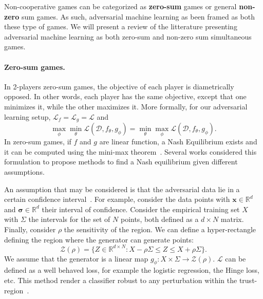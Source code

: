 Non-cooperative games can be categorized as \textbf{zero-sum} games or general \textbf{non-zero} sum games. As such, adversarial machine learning as been framed as both these type of games. We will present a review of the litterature presenting adversarial machine learning as both zero-sum and non-zero sum simultaneous games.

\paragraph{Zero-sum games.} In 2-players zero-sum games, the objective of each player is diametrically opposed. In other words, each player has the same objective, except that one minimizes it, while the other maximizes it. More formally, for our adversarial learning setup,  $\mathcal{L}_f=\mathcal{L}_g=\mathcal L$ and
\[
\max_{\phi}\min_{\theta}\mathcal{L}(\mathcal{D},f_{\theta},g_\phi) = \min_{\theta}\max_{\phi} \mathcal{L}(\mathcal{D},f_\theta,g_\phi).
\]
In zero-sum games, if $f$ and $g$ are linear function, a Nash Equilibrium exists and it can be computed using the mini-max theorem~\cite{roughgarden}. Several works considered this formulation to propose methods to find a Nash equilibrium given different assumptions.

An assumption that may be considered is that the adversarial data lie in a certain confidence interval~\cite{Ghaoui_robust_classification,Lanckriet_robust_minimax}. For example, consider the data points with $\bm x\in\mathbb{R}^d$ and $\bm\sigma\in\mathbb{R}^d$ their interval of confidence. Consider the empirical training set $X$ with $\Sigma$ the intervals for the set of $N$ points, both defined as a $d\times N$ matrix. Finally, consider $\rho$ the sensitivity of the region. We can define a hyper-rectangle defining the region where the generator can generate points:
\[
\mathcal{Z}(\rho) = \{Z\in\mathbb{R}^{d\times N}: X-\rho\Sigma\leq Z\leq X+\rho\Sigma\}.
\]
We assume that the generator is a linear map $g_\phi:X\times\Sigma\to\mathcal{Z}(\rho)$.
$\mathcal{L}$ can be defined as a well behaved loss, for example the logistic regression, the Hinge loss, etc. This method render a classifier robust to any perturbation within the trust-region~\cite{Ghaoui_robust_classification}.

